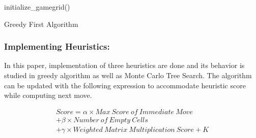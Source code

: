 \documentclass{svproc}
\begin{document}
\begin{itemize}
    




    \end{itemize}

    \begin{algorithm}[t]
        \SetAlgoLined
        initialize\_gamegrid()\;
        \caption{Greedy First Algorithm}
    \end{algorithm} 
    
    \subsubsection{Implementing Heuristics:} 
    In this paper, implementation of three heuristics are done and its behavior is studied in greedy algorithm as well as Monte Carlo Tree Search. The algorithm can be updated with the following expression to accommodate heuristic score while computing next move.

    \begin{multline} \label{heuristic_score_equation}
    Score  = \alpha \times Max \ Score \ of \  Immediate \ Move \\
    + \beta \times Number \ of \ Empty \  Cells \\
    + \gamma \times Weighted \ Matrix \ Multiplication \ Score  + K
    \end{multline}
\end{document}
